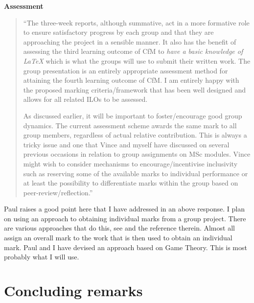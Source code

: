 \documentclass{article}
\begin{document}
\textbf{Assessment}

\begin{quote}
``The three-week reports, although summative, act in a more formative role to ensure satisfactory progress by each group and that they are approaching the project in a sensible manner. It also has the benefit of assessing the third learning outcome of CfM to \emph{have a basic knowledge of LaTeX} which is what the groups will use to submit their written work. The group presentation is an entirely appropriate assessment method for attaining the fourth learning outcome of CfM. I am entirely happy with the proposed marking criteria/framework that has been well designed and allows for all related ILOs to be assessed.

As discussed earlier, it will be important to foster/encourage good group dynamics. The current assessment scheme awards the same mark to all group members, regardless of actual relative contribution. This is always a tricky issue and one that Vince and myself have discussed on several previous occasions in relation to group assignments on MSc modules. Vince might wish to consider mechanisms to encourage/incentivise inclusivity such as reserving some of the available marks to individual performance or at least the possibility to differentiate marks within the group based on peer-review/reflection.''
\end{quote}

Paul raises a good point here that I have addressed in an above response. I plan on using an approach to obtaining individual marks from a group project. There are various approaches that do this, see \cite{lejk_survey_1996} and the reference therein. Almost all assign an overall mark to the work that is then used to obtain an individual mark. Paul and I have devised an approach based on Game Theory. This is most probably what I will use.

\section{Concluding remarks}
\end{document}
